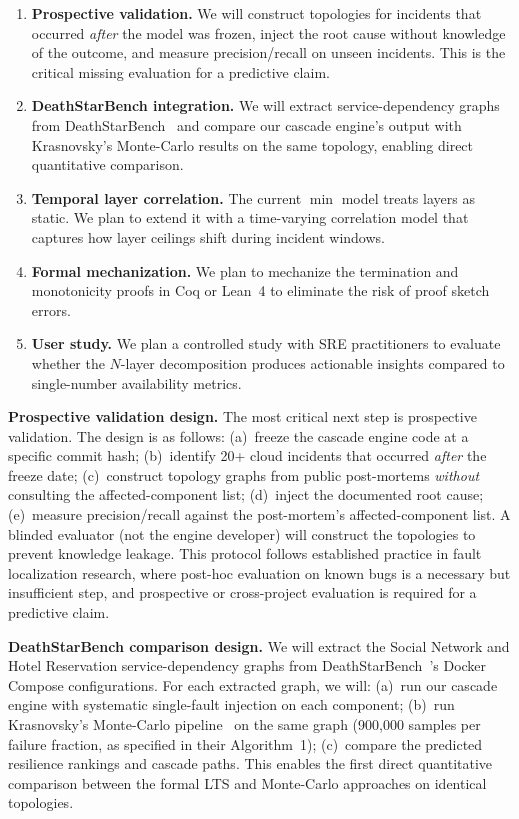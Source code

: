 \documentclass[conference,10pt]{IEEEtran}
\begin{document}
\begin{enumerate}[nosep]
  \item \textbf{Prospective validation.} We will construct topologies
    for incidents that occurred \emph{after} the model was frozen,
    inject the root cause without knowledge of the outcome, and
    measure precision/recall on unseen incidents. This is the
    critical missing evaluation for a predictive claim.
  \item \textbf{DeathStarBench integration.} We will extract
    service-dependency graphs from DeathStarBench~\cite{gan2019}
    and compare our cascade engine's output with
    Krasnovsky's Monte-Carlo results on the same topology,
    enabling direct quantitative comparison.
  \item \textbf{Temporal layer correlation.} The current $\min$
    model treats layers as static. We plan to extend it with a
    time-varying correlation model that captures how layer
    ceilings shift during incident windows.
  \item \textbf{Formal mechanization.} We plan to mechanize the
    termination and monotonicity proofs in Coq or Lean~4 to
    eliminate the risk of proof sketch errors.
  \item \textbf{User study.} We plan a controlled study with SRE
    practitioners to evaluate whether the $N$-layer decomposition
    produces actionable insights compared to single-number
    availability metrics.
\end{enumerate}

\textbf{Prospective validation design.}
The most critical next step is prospective validation. The design
is as follows: (a)~freeze the cascade engine code at a specific
commit hash; (b)~identify 20+ cloud incidents that occurred
\emph{after} the freeze date; (c)~construct topology graphs from
public post-mortems \emph{without} consulting the affected-component
list; (d)~inject the documented root cause; (e)~measure
precision/recall against the post-mortem's affected-component list.
A blinded evaluator (not the engine developer) will construct the
topologies to prevent knowledge leakage. This protocol follows
established practice in fault localization research, where
post-hoc evaluation on known bugs is a necessary but insufficient
step, and prospective or cross-project evaluation is required for
a predictive claim.

\textbf{DeathStarBench comparison design.}
We will extract the Social Network and Hotel Reservation
service-dependency graphs from DeathStarBench~\cite{gan2019}'s
Docker Compose configurations. For each extracted graph, we will:
(a)~run our cascade engine with systematic single-fault injection
on each component; (b)~run Krasnovsky's Monte-Carlo
pipeline~\cite{krasnovsky2026} on the same graph (900{,}000
samples per failure fraction, as specified in their Algorithm~1);
(c)~compare the predicted resilience rankings and cascade paths.
This enables the first direct quantitative comparison between the
formal LTS and Monte-Carlo approaches on identical topologies.
\end{document}
